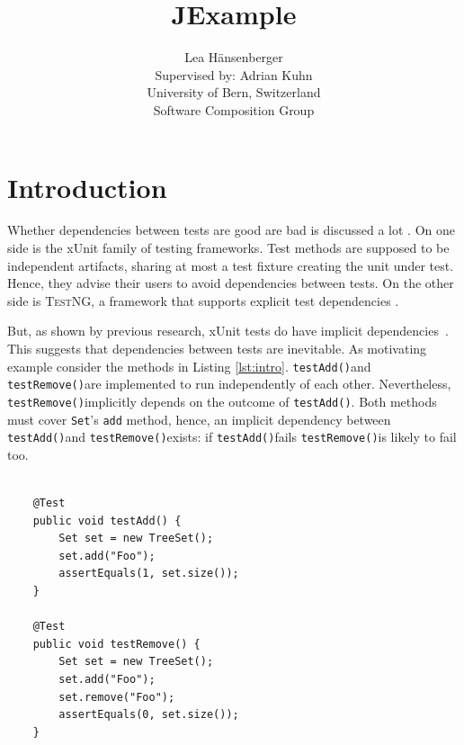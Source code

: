 \documentclass[11pt,a4paper,pdftex]{article}
\newcommand{\TestNG}{\textsc{TestNG}\xspace}
\newcommand{\ttt}[1]{\texttt{#1}}
\newcommand{\testAdd}{\ttt{testAdd()}}
\newcommand{\testRemove}{\ttt{testRemove()}}
\begin{document}
\title{JExample}

\author{Lea H\"ansenberger\\
	Supervised by: Adrian Kuhn\\
	University of Bern, Switzerland\\
	Software Composition Group
}

\maketitle

\begin{abstract}

\end{abstract}

\section{Introduction}

\lstset{language=Java}

Whether dependencies between tests are good are bad is discussed a lot \cite{Deur01a,Fews99a,Mesz07a}.
On one side is the xUnit family of testing frameworks. Test methods are supposed to be independent artifacts, sharing at most a test fixture creating the unit under test. Hence, they advise their users to avoid dependencies between tests.
On the other side is \TestNG, a framework that supports explicit test dependencies \cite{Bues07a}.

But, as shown by previous research, xUnit tests do have implicit dependencies\ \cite{Gael04c}.
This suggests that dependencies between tests are inevitable.
As motivating example consider the methods in Listing \ref{lst:intro}. \testAdd and \testRemove are implemented to run independently of each other. Nevertheless, \testRemove implicitly depends on the outcome of \testAdd. Both methods must cover \ttt{Set}'s \ttt{add} method, hence, an implicit dependency between \testAdd and \testRemove exists: if \testAdd fails \testRemove is likely to fail too.

\begin{lstlisting}[label=lst:intro,caption=Implicit dependency between test methods.]
    
    @Test
    public void testAdd() {
    	Set set = new TreeSet();
        set.add("Foo");
        assertEquals(1, set.size());
    }

    @Test
    public void testRemove() {
    	Set set = new TreeSet();
        set.add("Foo");
        set.remove("Foo");
        assertEquals(0, set.size());
    }
\end{lstlisting}
\end{document}
